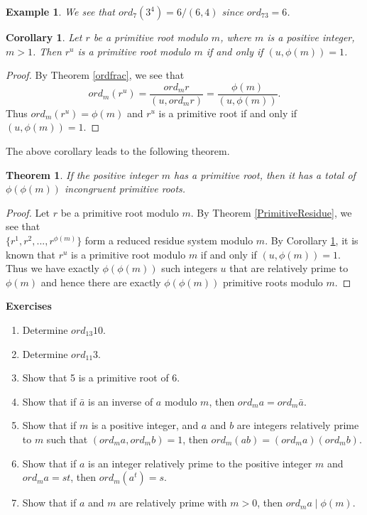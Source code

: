 \documentclass[12pt,letterpaper]{book}
\newtheorem{theorem}{Theorem}
\newtheorem{cor}{Corollary}
\newtheorem{example}{Example}
\begin{document}
\begin{example}
We see that $ord_7(3^4)=6/(6,4)$ since $ord_73=6$.
\end{example}

\begin{cor}\label{primitivecor}
Let $r$ be a primitive root modulo $m$, where $m$ is a positive
integer, $m>1$. Then $r^u$ is a primitive root modulo $m$ if and
only if $(u,\phi(m))=1$.
\end{cor}

\begin{proof}
By Theorem \ref{ordfrac}, we see that
\begin{equation*}
ord_m(r^u)=\frac{ord_mr}{(u,ord_mr)}=\frac{\phi(m)}{(u,\phi(m))}.
\end{equation*}
Thus $ord_m(r^u)=\phi(m)$ and $r^u$ is a primitive root if and only if
\mbox{$(u,\phi(m))=1$}.
\end{proof}

The above corollary leads to the following theorem.

\begin{theorem}
If the positive integer $m$ has a primitive root, then it has a
total of $\phi(\phi(m))$ incongruent primitive roots.
\end{theorem}

\begin{proof}
Let $r$ be a primitive root modulo $m$.  By Theorem \ref{PrimitiveResidue}, we see that\\
$\{r^1,r^2,...,r^{\phi(m)}\}$ form a reduced residue system modulo
$m$.  By Corollary \ref{primitivecor}, it is known that $r^u$ is a primitive root
modulo $m$ if and only if $(u,\phi(m))=1$.  Thus we have exactly
$\phi(\phi(m))$ such integers $u$ that are relatively prime to
$\phi(m)$ and hence there are exactly $\phi(\phi(m))$ primitive
roots modulo $m$.
\end{proof}

\textbf{Exercises}
\begin{enumerate}
\item{Determine $ord_{13}10$.}
\item{Determine $ord_{11}3.$}
\item{Show that 5 is a primitive root of 6.}
\item{Show that if $\bar{a}$ is an inverse of $a$ modulo $m$,
then $ord_ma=ord_m\bar{a}$.}
\item{Show that if $m$ is a positive
integer, and $a$ and $b$ are integers relatively prime to $m$ such
that $(ord_ma,ord_mb)=1$, then $ord_m(ab)=(ord_ma)(ord_mb)$.}
\item{Show that if $a$ is an integer relatively prime to the positive integer
$m$ and $ord_ma=st$, then $ord_m(a^t)=s$.}
\item{Show that if $a$ and $m$ are relatively prime with $m>0$, then $ord_ma \mid \phi(m)$.}
\end{enumerate}
\end{document}
